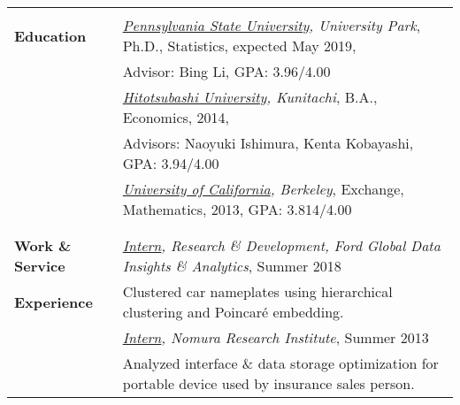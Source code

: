 \documentclass[utf8,letterpaper,oneside]{article}
\begin{document}
\begin{center}
 \begin{tabular}{l l}
  \hline
                           &                                                                                                                                                  \\
  \textbf{Education}       & \textit{\underline{Pennsylvania State University}, University Park}, {Ph.D., Statistics}, expected May 2019,                                     \\
                           & Advisor: Bing Li, GPA: 3.96/4.00                                                                                                                 \\
                           & \textit{\underline{Hitotsubashi University}, Kunitachi}, B.A., Economics, 2014,                                                                  \\
                           & Advisors: Naoyuki Ishimura, Kenta Kobayashi, GPA: 3.94/4.00                                                                                      \\
                           & \textit{\underline{University of California}, Berkeley}, Exchange, Mathematics, 2013, GPA: 3.814/4.00                                            \\
                           &                                                                                                                                                  \\ \hline
                           &                                                                                                                                                  \\
  \textbf{Work \& Service} & \textit{\underline{{Intern}}, Research \& Development, Ford Global Data Insights \& Analytics}, Summer 2018                                      \\
  \textbf{Experience}      & Clustered car nameplates using hierarchical clustering and Poincar\'e embedding.                                                                 \\
                           & \textit{\underline{{Intern}}, Nomura Research Institute}, Summer 2013                                                                            \\
                           & Analyzed interface \& data storage optimization for portable device used by insurance sales person.                                              \\

\end{tabular}
\end{center}
\end{document}
